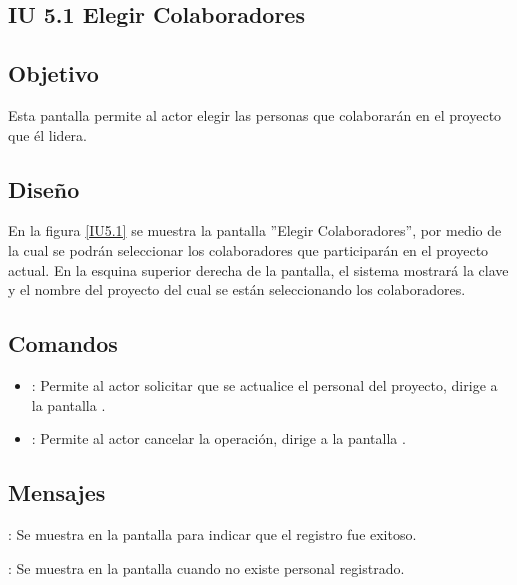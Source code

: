 \subsection{IU 5.1 Elegir Colaboradores}

\subsection{Objetivo}
	Esta pantalla permite al actor elegir las personas que colaborarán en el proyecto que él lidera.
\subsection{Diseño}
	En la figura \ref{IU5.1} se muestra la pantalla ''Elegir Colaboradores'', por medio de la cual se podrán seleccionar los colaboradores que participarán en el proyecto actual. En la esquina superior derecha de la pantalla, el sistema mostrará la clave y el nombre del proyecto del cual se están seleccionando los colaboradores.

\label{IU5.1}
\subsection{Comandos}
\begin{itemize}
	\item {}: Permite al actor solicitar que se actualice el personal del proyecto, dirige a la pantalla .
	\item {}: Permite al actor cancelar la operación, dirige a la pantalla .
\end{itemize}

\subsection{Mensajes}

\begin{Citemize}
	\item {}: Se muestra en la pantalla  para indicar que el registro fue exitoso.
	\item {}: Se muestra en la pantalla  cuando no existe personal registrado.
\end{Citemize}
